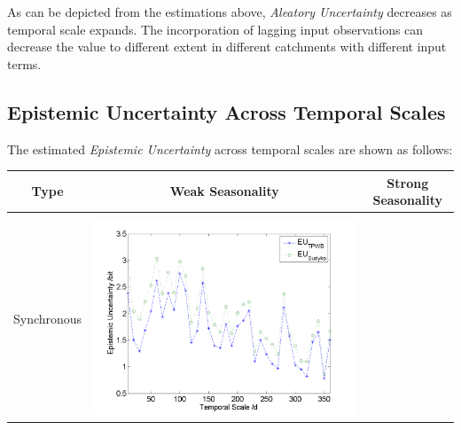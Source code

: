 \documentclass[review]{elsarticle}
\begin{document}
As can be depicted from the estimations above, \emph{Aleatory Uncertainty} decreases  as temporal scale expands. The incorporation of lagging input observations can decrease the value to different extent in different catchments with different input terms. 

\subsection{Epistemic Uncertainty Across Temporal Scales} 
The estimated \emph{Epistemic Uncertainty} across temporal scales are shown as follows:
\begin{table}[H] \small 
\label{eeuu}
\resizebox{\textwidth}{!}
{
\centering
\begin{tabular}{ccc}
\hline
Type& Weak Seasonality & Strong Seasonality \\\hline
\\
Synchronous
&\begin{minipage}{.6\textwidth}\includegraphics[width=\linewidth]{resultgraph/05585000EU.png}\end{minipage}


\end{tabular}}
\end{table}
\end{document}
